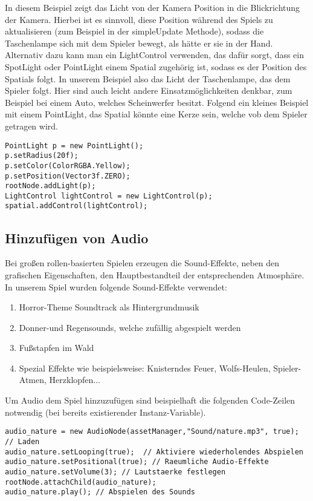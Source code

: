 In diesem Beispiel zeigt das Licht von der Kamera Position in die Blickrichtung der Kamera. Hierbei ist es sinnvoll, diese Position während des Spiels zu aktualisieren (zum Beispiel in der simpleUpdate Methode), sodass die Taschenlampe sich mit dem Spieler bewegt, als hätte er sie in der Hand. Alternativ dazu kann man ein LightControl verwenden, das dafür sorgt, dass ein SpotLight oder PointLight einem Spatial zugehörig ist, sodass es der Position des Spatials folgt. In unserem Beispiel also das Licht der Taschenlampe, das dem Spieler folgt. Hier sind auch leicht andere Einsatzmöglichkeiten denkbar, zum Beispiel bei einem Auto, welches Scheinwerfer besitzt. Folgend ein kleines Beispiel mit einem PointLight, das Spatial könnte eine Kerze sein, welche vob dem Spieler getragen wird.

\begin{lstlisting}
PointLight p = new PointLight();
p.setRadius(20f);
p.setColor(ColorRGBA.Yellow);
p.setPosition(Vector3f.ZERO);
rootNode.addLight(p);
LightControl lightControl = new LightControl(p);
spatial.addControl(lightControl); 
\end{lstlisting}

\subsection{Hinzufügen von Audio}
Bei großen rollen-basierten Spielen erzeugen die Sound-Effekte, neben den grafischen Eigenschaften, den Hauptbestandteil der entsprechenden Atmosphäre. In unserem Spiel wurden folgende Sound-Effekte verwendet:
\begin{enumerate}
	\item Horror-Theme Soundtrack als Hintergrundmusik
	\item Donner-und Regensounds, welche zufällig abgespielt werden
	\item Fußstapfen im Wald
	\item Spezial Effekte wie beispielsweise: Knisterndes Feuer, Wolfs-Heulen, Spieler-Atmen, Herzklopfen...
\end{enumerate} Um Audio dem Spiel hinzuzufügen sind beispielhaft die folgenden Code-Zeilen notwendig (bei bereits existierender Instanz-Variable).

\begin{lstlisting}
audio_nature = new AudioNode(assetManager,"Sound/nature.mp3", true); // Laden
audio_nature.setLooping(true);  // Aktiviere wiederholendes Abspielen
audio_nature.setPositional(true); // Raeumliche Audio-Effekte  
audio_nature.setVolume(3); // Lautstaerke festlegen
rootNode.attachChild(audio_nature); 
audio_nature.play(); // Abspielen des Sounds
\end{lstlisting}


